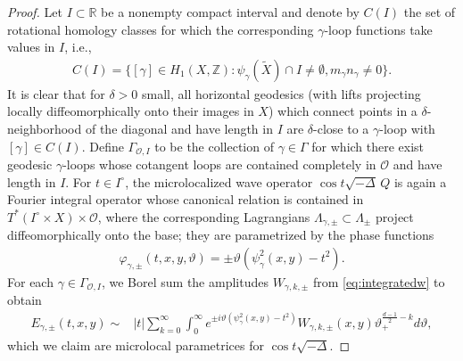 \documentclass[11pt,letterpaper,oneside]{amsart}
\newcommand{\Z}{\mathbb{Z}}
\newcommand{\R}{\mathbb{R}}
\renewcommand{\phi}{\varphi}
\renewcommand{\theta}{\vartheta}
\theoremstyle{definition}
\theoremstyle{remark}
\newcommand{\wt}{\widetilde}
\newcommand{\dt}{\delta}
\theoremstyle{definition}
\theoremstyle{remark}
\newcommand{\CO}{\mathcal{O}}
\begin{document}
\begin{proof}
    Let $I \subset \R$ be a nonempty compact interval and denote by $C(I)$ the set of rotational homology classes for which the corresponding $\gamma$-loop functions take values in $I$, i.e.,
    \begin{align*}
        C(I) = \{[\gamma] \in H_1(X,\Z): \psi_\gamma(\wt X) \cap I \neq \emptyset, m_\gamma n_\gamma \neq 0\}.
    \end{align*}
    It is clear that for $\dt > 0$ small, all horizontal geodesics (with lifts projecting locally diffeomorphically onto their images in $X$) which connect points in a $\delta$-neighborhood of the diagonal and have length in $I$ are $\delta$-close to a $\gamma$-loop with $[\gamma] \in C(I)$. Define $\Gamma_{\CO, I}$ to be the collection of $\gamma \in \Gamma$ for which there exist geodesic $\gamma$-loops whose cotangent loops are contained completely in $\CO$ and have length in $I$. For $t \in I^\circ$, the microlocalized wave operator $\cos t \sqrt{- \Delta} \,Q$ is again a Fourier integral operator whose canonical relation is contained in $T^* (I^\circ \times X) \times \CO$, where the corresponding Lagrangians $\Lambda_{\gamma, \pm} \subset \Lambda_\pm$ project diffeomorphically onto the base; they are parametrized by the phase functions
    \begin{align*}
        \phi_{\gamma, \pm}(t,x,y,\theta) = \pm \theta(\psi_\gamma^2(x,y) - t^2).
    \end{align*}
    For each $\gamma \in \Gamma_{\CO, I}$, we Borel sum the amplitudes $W_{\gamma, k,\pm}$ from \eqref{eq:integratedw} to obtain
    \begin{align*}
         E_{\gamma, \pm}(t,x,y) \sim & |t| \sum_{k = 0}^\infty \int_0^\infty e^{\pm i \theta (\psi_{\gamma}^2(x,y)  - t^2)} W_{\gamma, k, \pm} (x,y) \theta_+^{\frac{d- 1}{2} - k} d\theta,
    \end{align*}
    which we claim are microlocal parametrices for $\cos t \sqrt{-\Delta}$.
    
    \medskip
    

\end{proof}
\end{document}
